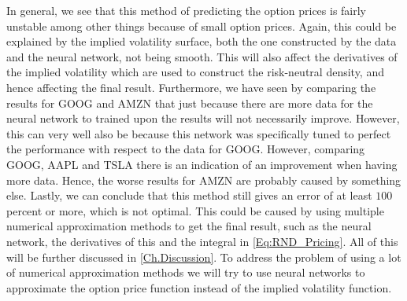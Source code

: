 In general, we see that this method of predicting the option prices is fairly unstable among other things because of small option prices. Again, this could be explained by the implied volatility surface, both the one constructed by the data and the neural network, not being smooth. This will also affect the derivatives of the implied volatility which are used to construct the risk-neutral density, and hence affecting the final result. Furthermore, we have seen by comparing the results for GOOG and AMZN that just because there are more data for the neural network to trained upon the results will not necessarily improve. However, this can very well also be because this network was specifically tuned to perfect the performance with respect to the data for GOOG. However, comparing GOOG, AAPL and TSLA there is an indication of an improvement when having more data. Hence, the worse results for AMZN are probably caused by something else. Lastly, we can conclude that this method still gives an error of at least $100$ percent or more, which is not optimal. This could be caused by using multiple numerical approximation methods to get the final result, such as the neural network, the derivatives of this and the integral in \eqref{Eq:RND_Pricing}. All of this will be further discussed in \autoref{Ch.Discussion}. To address the problem of using a lot of numerical approximation methods we will try to use neural networks to approximate the option price function instead of the implied volatility function. 


 